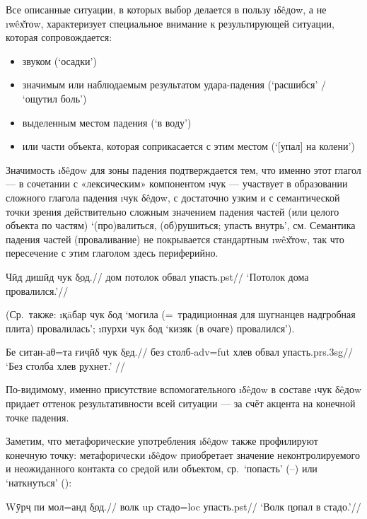 Все описанные ситуации, в которых выбор делается в пользу \i{δêдоw}, а не \i{wêх̌тоw}, характеризует специальное внимание к результирующей ситуации, которая сопровождается:

\begin{itemize}
  \item звуком (‘осадки’)
  \item значимым или наблюдаемым результатом удара-падения (‘расшибся’ / ‘ощутил боль’)
  \item выделенным местом падения (‘в воду’)
  \item или части объекта, которая соприкасается с этим местом (‘[упал] на колени’)
\end{itemize}

Значимость \i{δêдоw} для зоны падения подтверждается тем, что именно этот глагол — в сочетании с «лексическим» компонентом \i{чук} — участвует в образовании сложного глагола падения \i{чук δêдоw}, с достаточно узким и с семантической точки зрения действительно сложным значением падения частей (или целого объекта по частям) ‘(про)валиться, (об)рушиться; упасть внутрь’, см. \parencite[388]{karamshoev1999} Семантика падения частей (проваливание) не покрывается стандартным \i{wêх̌тоw}, так что пересечение с этим глаголом здесь периферийно.

\begingl
\gla Чӣд дишӣд чук \b{δод}.//
\glc дом потолок обвал упасть.{\sc pst}//
\glft ‘Потолок дома \b{провалился}.’//
\endgl \xe

(Ср.~также: \i{қāбар чук δод} ‘могила (=~традиционная для шугнанцев надгробная плита) провалилась’; \i{пурхи чук δод} ‘кизяк (в очаге) провалился’).

\begingl
\gla Бе ситан-аθ=та ғиҷӣδ чук \b{δед}.//
\glc без столб-{\sc adv=fut} хлев обвал упасть.{\sc prs.3sg}//
\glft ‘Без столба хлев \b{рухнет}.’ //
\endgl \xe

По-видимому, именно присутствие вспомогательного \i{δêдоw} в составе \i{чук δêдоw} придает оттенок результативности всей ситуации — за счёт акцента на конечной точке падения.

Заметим, что метафорические употребления \i{δêдоw} также профилируют конечную точку: метафорически \i{δêдоw} приобретает значение неконтролируемого и неожиданного контакта со средой или объектом, ср.~‘попасть’ (–) или ‘наткнуться’ ():

\begingl
\gla Wӯрҷ пи мол=анд \b{δод}.//
\glc волк {\sc up} стадо={\sc loc} упасть.{\sc pst}//
\glft ‘Волк \b{попал} в стадо.’//
\endgl \xe

